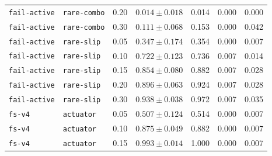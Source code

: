 \documentclass{article}
\begin{document}
\begin{center}
\begin{tabular}{lllcccc}
\texttt{fail-active} & \texttt{rare-combo} & 0.20 & $0.014 \pm 0.018$ & 0.014 & 0.000 & 0.000 \\
\texttt{fail-active} & \texttt{rare-combo} & 0.30 & $0.111 \pm 0.068$ & 0.153 & 0.000 & 0.042 \\
\texttt{fail-active} & \texttt{rare-slip} & 0.05 & $0.347 \pm 0.174$ & 0.354 & 0.000 & 0.007 \\
\texttt{fail-active} & \texttt{rare-slip} & 0.10 & $0.722 \pm 0.123$ & 0.736 & 0.007 & 0.014 \\
\texttt{fail-active} & \texttt{rare-slip} & 0.15 & $0.854 \pm 0.080$ & 0.882 & 0.007 & 0.028 \\
\texttt{fail-active} & \texttt{rare-slip} & 0.20 & $0.896 \pm 0.063$ & 0.924 & 0.007 & 0.028 \\
\texttt{fail-active} & \texttt{rare-slip} & 0.30 & $0.938 \pm 0.038$ & 0.972 & 0.007 & 0.035 \\
\texttt{fs-v4} & \texttt{actuator} & 0.05 & $0.507 \pm 0.124$ & 0.514 & 0.000 & 0.007 \\
\texttt{fs-v4} & \texttt{actuator} & 0.10 & $0.875 \pm 0.049$ & 0.882 & 0.000 & 0.007 \\
\texttt{fs-v4} & \texttt{actuator} & 0.15 & $0.993 \pm 0.014$ & 1.000 & 0.000 & 0.007 \\
\bottomrule
\end{tabular}
\end{center}
\end{document}

